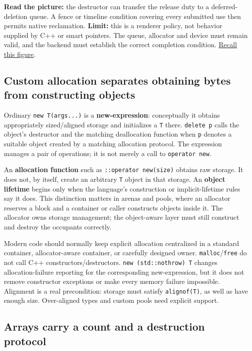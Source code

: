 \textbf{Read the picture:} the destructor can transfer the release duty to a deferred-deletion queue. A fence or timeline condition covering every submitted use then permits native reclamation. \textbf{Limit:} this is a renderer policy, not behavior supplied by C++ or smart pointers. The queue, allocator and device must remain valid, and the backend must establish the correct completion condition. \hyperref[appendix-960160274237-four-figure-briefs]{Recall this figure}.

\subsection{Custom allocation separates obtaining bytes from constructing objects}\label{01-foundations-i-ch004-custom-allocation-separates-obtaining-bytes-from-constructing-objects}

Ordinary \texttt{new\ T(args...)} is a \textbf{new-expression}: conceptually it obtains appropriately sized/aligned storage and initializes a \texttt{T} there. \texttt{delete\ p} calls the object's destructor and the matching deallocation function when \texttt{p} denotes a suitable object created by a matching allocation protocol. The expression manages a pair of operations; it is not merely a call to \texttt{operator\ new}.

An \textbf{allocation function} such as \texttt{::operator\ new(size)} obtains raw storage. It does not, by itself, create an arbitrary \texttt{T} object in that storage. An \textbf{object lifetime} begins only when the language's construction or implicit-lifetime rules say it does. This distinction matters in arenas and pools, where an allocator reserves a block and a container or caller constructs objects inside it. The allocator owns storage management; the object-aware layer must still construct and destroy the occupants correctly.

Modern code should normally keep explicit allocation centralized in a standard container, allocator-aware container, or carefully designed owner. \texttt{malloc}/\texttt{free} do not call C++ constructors/destructors. \texttt{new\ (std::nothrow)\ T} changes allocation-failure reporting for the corresponding new-expression, but it does not remove constructor exceptions or make every memory failure impossible. Alignment is a real precondition: storage must satisfy \texttt{alignof(T)}, as well as have enough size. Over-aligned types and custom pools need explicit support.

\subsection{Arrays carry a count and a destruction protocol}\label{01-foundations-i-ch004-arrays-carry-a-count-and-a-destruction-protocol}


